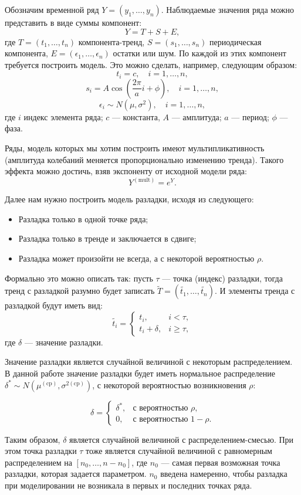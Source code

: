 \documentclass[%
12pt,
master,  %
natbib,      %
subf,        %
substylefile = spbu.rtx,
href,        %
colorlinks,  %
]{disser}
\begin{document}
Обозначим временной ряд $Y = (y_1, \dots, y_n)$. Наблюдаемые значения ряда можно представить в виде суммы компонент:
$$ Y = T + S + E ,$$ 
где  $ T = (t_1, \dots, t_n) $ компонента-тренд, $ S = (s_1, \dots, s_n) $ периодическая компонента, $ E = (\epsilon_1, \dots, \epsilon_n) $ остатки или шум.
По каждой из этих компонент требуется построить модель. Это можно сделать, например, следующим образом:
$$ t_i = c, \quad i = 1, \dots, n, $$
$$ s_i = A \cos(\frac{2\pi}{a} i + \phi), \quad i = 1, \dots, n,$$
$$ \epsilon_i \sim N(\mu, \sigma^2), \quad i = 1, \dots, n, $$
где $i$ индекс элемента ряда; $c$ --- константа, $A$ --- амплитуда; $a$ --- период; $\phi$ --- фаза.

Ряды, модель которых мы хотим построить имеют мультипликативность (амплитуда колебаний меняется пропорционально изменению тренда). Такого эффекта можно достичь, взяв экспоненту от исходной модели ряда:
$$ Y^{\mathrm{(mult)}} = e^{Y}. $$

Далее нам нужно построить модель разладки, исходя из следующего:
\begin{itemize}
	\item Разладка только в одной точке ряда;
	\item Разладка только в тренде и заключается в сдвиге;
	\item Разладка может произойти не всегда, а с некоторой вероятностью $\rho$.
\end{itemize}
Формально это можно описать так: пусть $\tau$ --- точка (индекс) разладки, тогда тренд с разладкой разумно будет записать $ \tilde{T} = (\tilde{t_1}, \dots, \tilde{t_n}) $. И элементы тренда с разладкой будут иметь вид:
$$ \tilde{t_i} =
	\begin{cases}
		t_i, & i < \tau, \\
		t_i + \delta, & i \geqslant \tau,
	\end{cases}
$$
где $ \delta $  --- значение разладки.

Значение разладки является случайной величиной с некоторым распределением. В данной работе значение разладки будет иметь нормальное распределение $ \delta^* \sim N(\mu^{\mathrm{(cp)}}, \sigma^{2\mathrm{(cp)}})  $, с некоторой вероятностью возникновения $ \rho $:

$$   
\delta = \begin{cases}
    		\delta^*, & \textrm{с вероятностью } \rho, \\
  		0, & \textrm{с вероятностью } 1 - \rho.
	\end{cases} 
$$

Таким образом, $\delta$ является случайной величиной с распределением-смесью. При этом точка разладки  $\tau$ тоже является случайной величиной с равномерным распределением на $ [n_0, \dots, n - n_0 ] $, где $ n_0 $ --- самая первая возможная точка разладки, которая задается параметром. $n_0$ введена намеренно, чтобы разладка при моделировании не возникала в первых и последних точках ряда.
\end{document}
